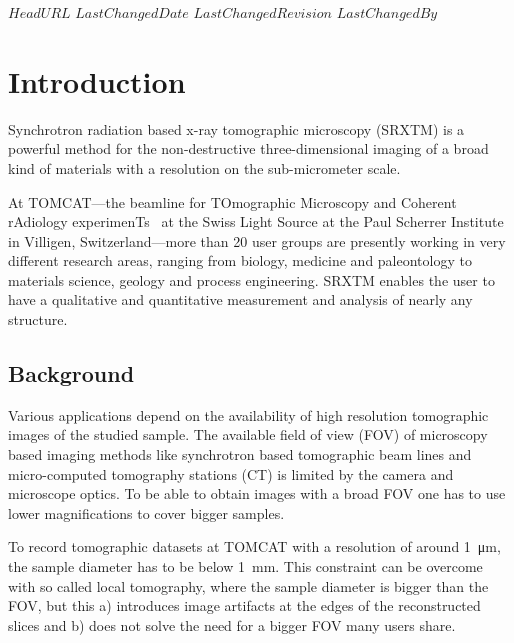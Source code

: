 \svnidlong
{$HeadURL$}
{$LastChangedDate$}
{$LastChangedRevision$}
{$LastChangedBy$}

\begin{center}
\end{center}

\section{Introduction}
Synchrotron radiation based x-ray tomographic microscopy (SRXTM) is a powerful method for the non-destructive three-dimensional imaging of a broad kind of materials with a resolution on the sub-micrometer scale.

At TOMCAT---the beamline for TOmographic Microscopy and Coherent rAdiology experimenTs~\cite{Stampanoni2007} at the Swiss Light Source at the Paul Scherrer Institute in Villigen, Switzerland---more than 20 user groups are presently working in very different research areas, ranging from biology, medicine and paleontology to materials science, geology and process engineering. SRXTM enables the user to have a qualitative and quantitative measurement and analysis of nearly any structure.

\subsection{Background}
Various applications depend on the availability of high resolution tomographic images of the studied sample. The available field of view (FOV) of microscopy based imaging methods like synchrotron based tomographic beam lines and micro-computed tomography stations (\micro CT) is limited by the camera and microscope optics. To be able to obtain images with a broad FOV one has to use lower magnifications to cover bigger samples.

To record tomographic datasets at TOMCAT with a resolution of around \SI{1}{\micro\meter}, the sample diameter has to be below \SI{1}{\milli\meter}. This constraint can be overcome with so called local tomography, where the sample diameter is bigger than the FOV, but this a) introduces image artifacts at the edges of the reconstructed slices and b) does not solve the need for a bigger FOV many users share.

